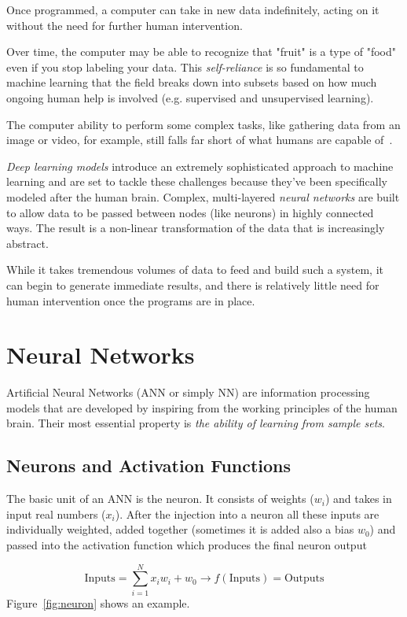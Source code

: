 Once programmed, a computer can take in new data indefinitely, acting on it without the need for further human intervention. 

Over time, the computer may be able to recognize that "fruit" is a type of "food" even if you stop labeling your data. This \emph{self-reliance} is so fundamental to machine learning that the field breaks down into subsets based on how much ongoing human help is involved (e.g. supervised and unsupervised learning).
    
The computer ability to perform some complex tasks, like gathering data from an image or video, for example, still falls far short of what humans are capable of~\cite{bib:nn_over_human}.

\emph{Deep learning models} introduce an extremely sophisticated approach to machine learning and are set to tackle these challenges because they've been specifically modeled after the human brain. Complex, multi-layered \emph{neural networks} are built to allow data to be passed between nodes (like neurons) in highly connected ways. The result is a non-linear transformation of the data that is increasingly abstract.

While it takes tremendous volumes of data to feed and build such a system, it can begin to generate immediate results, and there is relatively little need for human intervention once the programs are in place.
    
\section{Neural Networks}\label{neural-networks}

Artificial Neural Networks (ANN or simply NN) are information processing models that are developed by inspiring from the working principles of the human brain. Their most essential property is \emph{the ability of learning from sample sets}.

\subsection{Neurons and Activation Functions}
The basic unit of an ANN is the neuron.
It consists of weights (\(w_i\)) and takes in input real numbers (\(x_i\)). After the injection into a neuron all these inputs are individually weighted, added together (sometimes it is added also a bias \(w_0\)) and passed into the activation function which produces the final neuron output

\[ \textrm{Inputs} = \sum_{i=1}^{N} x_i w_i + w_0 \rightarrow f(\textrm{Inputs}) = \textrm{Outputs}\]
Figure~\ref{fig:neuron} shows an example.

